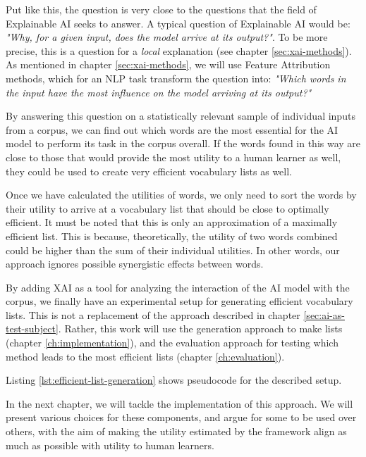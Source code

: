 Put like this, the question is very close to the questions that the field of Explainable AI seeks to answer.
A typical question of Explainable AI would be:
\textit{"Why, for a given input, does the model arrive at its output?"}. 
To be more precise, this is a question for a \textit{local} explanation (see chapter \ref{sec:xai-methods}).
As mentioned in chapter \ref{sec:xai-methods}, we will use Feature Attribution methods, which for an NLP task transform the question into:
\textit{"Which words in the input have the most influence on the model arriving at its output?"}

By answering this question on a statistically relevant sample of individual inputs from a corpus, we can find out which words are the most essential for the AI model to perform its task in the corpus overall.
If the words found in this way are close to those that would provide the most utility to a human learner as well, they could be used to create very efficient vocabulary lists as well.

Once we have calculated the utilities of words, we only need to sort the words by their utility to arrive at a vocabulary list that should be close to optimally efficient.
It must be noted that this is only an approximation of a maximally efficient list.
This is because, theoretically, the utility of two words combined could be higher than the sum of their individual utilities.
In other words, our approach ignores possible synergistic effects between words.

By adding XAI as a tool for analyzing the interaction of the AI model with the corpus, we finally have an experimental setup for generating efficient vocabulary lists.
This is not a replacement of the approach described in chapter \ref{sec:ai-as-test-subject}.
Rather, this work will use the generation approach to make lists (chapter \ref{ch:implementation}), and the evaluation approach for testing which method leads to the most efficient lists (chapter \ref{ch:evaluation}).


Listing \ref{lst:efficient-list-generation} shows pseudocode for the described setup.





In the next chapter, we will tackle the implementation of this approach.
We will present various choices for these components, and argue for some to be used over others, with the aim of making the utility estimated by the framework align as much as possible with utility to human learners.

